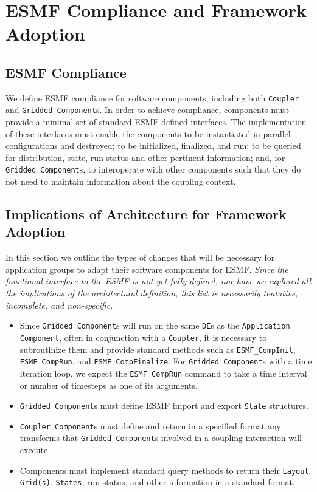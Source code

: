 \section{ESMF Compliance and Framework Adoption}
\label{sec:implications}

\subsection{ESMF Compliance}

We define ESMF compliance for software components, including
both {\tt Coupler} and {\tt Gridded Component}s.  In order to 
achieve compliance, 
components must provide a minimal set of standard ESMF-defined 
interfaces.  The implementation of these interfaces must enable the  
components to be instantiated in parallel configurations
and destroyed; to be initialized, finalized, and run; to be queried for 
distribution, state, run status and other pertinent information;
and, for {\tt Gridded Component}s, to interoperate with other components such
that they do not need to maintain information about the coupling context.

\subsection{Implications of Architecture for Framework Adoption}

In this section we outline the types of changes that will be necessary for
application groups to adapt their software components for ESMF.  {\it Since the
functional interface to the ESMF is not yet fully defined, nor have we 
explored all the implications of the architectural definition, this list is 
necessarily tentative, incomplete, and non-specific.}

\begin{itemize}
\item Since {\tt Gridded Component}s will run on the same 
{\tt DE}s as the {\tt Application Component}, often in conjunction 
with a {\tt Coupler}, 
it is necessary to subroutinize
them and provide standard methods such as {\tt ESMF\_CompInit}, 
{\tt ESMF\_CompRun}, and {\tt ESMF\_CompFinalize}.  For {\tt Gridded 
Component}s
with a time iteration loop, we expect the {\tt ESMF\_CompRun} command to 
take a time interval or number of timesteps as one of its arguments.
\item {\tt Gridded Component}s must define ESMF import and export {\tt State} 
structures.
\item {\tt Coupler Component}s must define and return in a specified 
format any transforms that {\tt Gridded Component}s involved 
in a coupling interaction will execute.
\item Components must implement standard query methods to return
their {\tt Layout}, {\tt Grid(s)}, {\tt States}, run status, and other 
information in a standard format.
\end{itemize}

